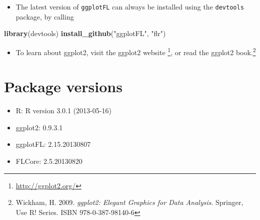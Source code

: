\documentclass{tufte-handout}
\newenvironment{Shaded}{}{}
\newcommand{\KeywordTok}[1]{\textcolor[rgb]{0.00,0.44,0.13}{\textbf{{#1}}}}
\newcommand{\StringTok}[1]{\textcolor[rgb]{0.25,0.44,0.63}{{#1}}}
\newcommand{\NormalTok}[1]{{#1}}
\begin{document}
\begin{itemize}
\item
  The latest version of \texttt{ggplotFL} can always be installed using
  the \texttt{devtools} package, by calling
\end{itemize}
\begin{Shaded}
\begin{Highlighting}[]
\KeywordTok{library}\NormalTok{(devtools)}
\KeywordTok{install_github}\NormalTok{(}\StringTok{"ggplotFL"}\NormalTok{, }\StringTok{"flr"}\NormalTok{)}
\end{Highlighting}
\end{Shaded}
\begin{itemize}
\item
  To learn about ggplot2, visit the ggplot2 website \footnote{\url{http://ggplot2.org/}},
  or read the ggplot2 book.\footnote{Wickham, H. 2009. \emph{ggplot2:
    Elegant Graphics for Data Analysis}. Springer, Use R! Series. ISBN
    978-0-387-98140-6}
\end{itemize}
\section{Package versions}

\begin{itemize}
\item
  R: R version 3.0.1 (2013-05-16)
\item
  ggplot2: 0.9.3.1
\item
  ggplotFL: 2.15.20130807
\item
  FLCore: 2.5.20130820
\end{itemize}
\end{document}
